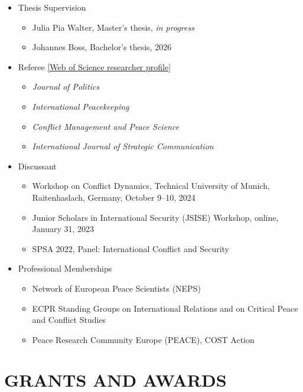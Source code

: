 \documentclass[11pt,a4paper,roman]{moderncv}
\begin{document}
\begin{itemize}
  \item Thesis Supervision
    \begin{itemize}
      \item Julia Pia Walter, Master's thesis, \textit{in progress}
      \item Johannes Boss, Bachelor's thesis, 2026
    \end{itemize}
  \item Referee \href{https://www.webofscience.com/wos/author/rid/ACC-8915-2022}{[Web of Science researcher profile]}
    \begin{itemize}
      \item \textit{Journal of Politics}
      \item \textit{International Peacekeeping}
      \item \textit{Conflict Management and Peace Science}
      \item \textit{International Journal of Strategic Communication}
    \end{itemize}
  \item Discussant
    \begin{itemize}
      \item Workshop on Conflict Dynamics, Technical University of Munich, Raitenhaslach, Germany, October 9--10, 2024
      \item Junior Scholars in International Security (JSISE) Workshop, online, January 31, 2023
      \item SPSA 2022, Panel: International Conflict and Security
    \end{itemize}
  \item Professional Memberships
    \begin{itemize}
      \item Network of European Peace Scientists (NEPS)
      \item ECPR Standing Groups on International Relations and on Critical Peace and Conflict Studies
      \item Peace Research Community Europe (PEACE), COST Action
    \end{itemize}
\end{itemize}

\section{GRANTS AND AWARDS}
\end{document}
